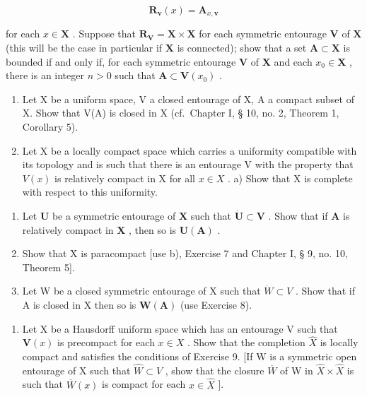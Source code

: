 \[
\mathbf {R} _ {\mathbf {v}} (x) = \mathbf {A} _ {x, \mathbf {v}}
\]

for each \(x \in \mathbf{X}\) . Suppose that \(\mathbf{R}_{\mathbf{V}} = \mathbf{X} \times \mathbf{X}\) for each symmetric entourage \(\mathbf{V}\) of \(\mathbf{X}\) (this will be the case in particular if \(\mathbf{X}\) is connected); show that a set \(\mathbf{A} \subset \mathbf{X}\) is bounded if and only if, for each symmetric entourage \(\mathbf{V}\) of \(\mathbf{X}\) and each \(x_0 \in \mathbf{X}\) , there is an integer \(n > 0\) such that \(\mathbf{A} \subset \mathbf{V}(x_0)\) .

\begin{enumerate}
\def\labelenumi{\arabic{enumi})}
\setcounter{enumi}{7}
\item
  Let X be a uniform space, V a closed entourage of X, A a compact subset of X. Show that V(A) is closed in X (cf.~Chapter I, § 10, no. 2, Theorem 1, Corollary 5).
\item
  Let X be a locally compact space which carries a uniformity compatible with its topology and is such that there is an entourage V with the property that \(V(x)\) is relatively compact in X for all \(x \in X\) . a) Show that X is complete with respect to this uniformity.
\end{enumerate}

\begin{enumerate}
\def\labelenumi{\alph{enumi})}
\setcounter{enumi}{1}
\item
  Let \(\mathbf{U}\) be a symmetric entourage of \(\mathbf{X}\) such that \(\dot{\mathbf{U}}\subset\mathbf{V}\) . Show that if \(\mathbf{A}\) is relatively compact in \(\mathbf{X}\) , then so is \(\mathbf{U}(\mathbf{A})\) .
\item
  Show that X is paracompact {[}use b), Exercise 7 and Chapter I, § 9, no. 10, Theorem 5{]}.
\item
  Let W be a closed symmetric entourage of X such that \(\dot{W} \subset V\) . Show that if A is closed in X then so is \(\mathbf{W}(\mathbf{A})\) (use Exercise 8).
\end{enumerate}

\begin{enumerate}
\def\labelenumi{\arabic{enumi})}
\setcounter{enumi}{9}
\tightlist
\item
  Let X be a Hausdorff uniform space which has an entourage V such that \(\mathbf{V}(x)\) is precompact for each \(x \in X\) . Show that the completion \(\hat{X}\) is locally compact and satisfies the conditions of Exercise 9. {[}If W is a symmetric open entourage of X such that \(\hat{W} \subset V\) , show that the closure \(\overline{W}\) of W in \(\hat{X} \times \hat{X}\) is such that \(\overline{W}(x)\) is compact for each \(x \in \hat{X}\) {]}.
\end{enumerate}

